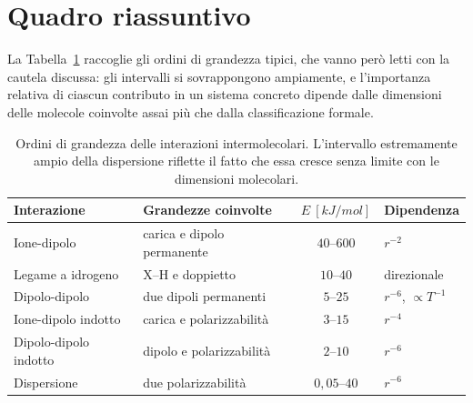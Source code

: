 \section{Quadro riassuntivo}

La Tabella~\ref{tab:riepilogo} raccoglie gli ordini di grandezza tipici, che vanno però letti con la cautela discussa: gli intervalli si sovrappongono ampiamente, e l'importanza relativa di ciascun contributo in un sistema concreto dipende dalle dimensioni delle molecole coinvolte assai più che dalla classificazione formale.

\begin{table}[htbp]
    \centering
    \begin{tabular}{llcl}
        \toprule
        Interazione & Grandezze coinvolte & $E \ [kJ/mol]$ & Dipendenza \\
        \midrule
        Ione-dipolo          & carica e dipolo permanente     & $40$--$600$   & $r^{-2}$ \\
        Legame a idrogeno    & $\mathrm{X}$--$\mathrm{H}$ e doppietto & $10$--$40$ & direzionale \\
        Dipolo-dipolo        & due dipoli permanenti          & $5$--$25$     & $r^{-6}$, $\propto T^{-1}$ \\
        Ione-dipolo indotto  & carica e polarizzabilità       & $3$--$15$     & $r^{-4}$ \\
        Dipolo-dipolo indotto& dipolo e polarizzabilità       & $2$--$10$     & $r^{-6}$ \\
        Dispersione          & due polarizzabilità            & $0{,}05$--$40$& $r^{-6}$ \\
        \bottomrule
    \end{tabular}
    \caption{Ordini di grandezza delle interazioni intermolecolari.
    L'intervallo estremamente ampio della dispersione riflette il fatto che essa cresce senza limite con le dimensioni molecolari.}
    \label{tab:riepilogo}
\end{table}
